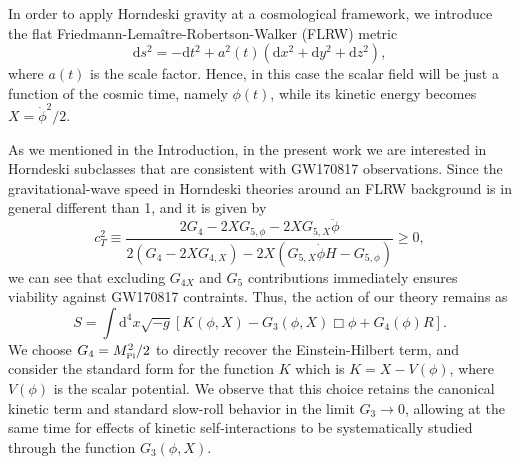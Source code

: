 \documentclass[nofootinbib,aps,a4paper,letterpaper,superscriptaddress,
twocolumn,times]{revtex4}
\renewcommand{\(}{\left(}
\renewcommand{\)}{\right)}
\renewcommand{\(}{\left(}
\renewcommand{\)}{\right)}
\renewcommand{\[}{\left[}
\renewcommand{\]}{\right]}
\begin{document}
In order to apply Horndeski gravity at a cosmological framework, we introduce 
the flat Friedmann-Lemaître-Robertson-Walker (FLRW) metric
\begin{equation}
\mathrm{d}s^2 = 
-\mathrm{d}t^2 + a^2 (t) (\mathrm{d}x^2 + \mathrm{d}y^2 + \mathrm{d}z^2),
\end{equation}
where $a(t)$ is the scale factor. Hence, in this case the scalar field will be 
just a function of the cosmic time, namely $\phi(t)$, while its kinetic energy 
 becomes $X=\dot{\phi}^2/2$.
 
As we mentioned in the Introduction, in the present work we are interested in  
Horndeski subclasses that are consistent with GW170817 observations. Since the  
gravitational-wave 
speed in Horndeski theories around an FLRW background is in general   different 
than 1, and it is given by  \cite{DeFelice:2011bh}
\begin{equation}
c_{T}^{2}\equiv\frac{ 2G_{4}-2XG_{5,\phi}\!-\!2XG_{5,X}\ddot{\phi} }{ 2 
(G_{{4}}-2 
XG_{{4,X}})-2X (G_{{5,X}}{\dot{\phi}}H-G_{{5,\phi}})}
\geq0,
\label{cTcon2}
\end{equation}
we can see that excluding $G_{4X}$ and 
$ G_{5}$ contributions immediately   ensures viability against GW170817 
contraints. Thus,  the action of our theory remains as 
\begin{equation}\label{eq:S}
S = \int \mathrm{d}^4x \sqrt{-g} \left[ K(\phi, X) - G_3(\phi, X)\Box\phi  
+G_4(\phi)R  \right].
\end{equation} 
We choose $G_4=M_{\scriptscriptstyle{\mathrm{Pl}}}^{2}/2$ to directly recover the Einstein-Hilbert term, and 
consider the standard form for the function $K$ which is $K = X - V(\phi)$, 
where $V(\phi)$ is the scalar potential. We observe that  this choice retains 
the canonical kinetic term and standard slow-roll behavior in the limit $G_3 
\to 0$, allowing at the same time for effects of kinetic self-interactions to 
be systematically studied through the function $G_3(\phi, X)$.
\end{document}

